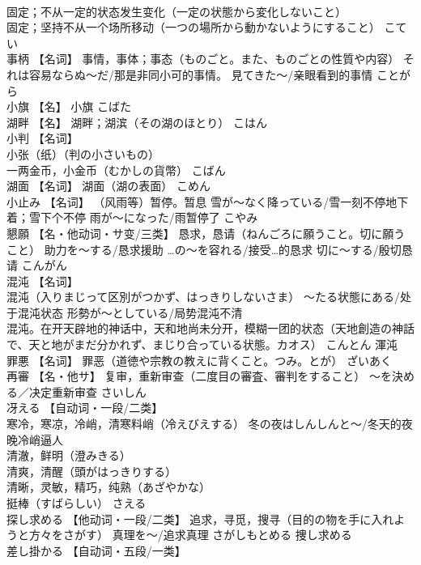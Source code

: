 \documentclass[8pt]{extreport}
\begin{document}
\begin{CJK}{UTF8}{min}
\\	固定；不从一定的状态发生变化（一定の状態から変化しないこと） 
\\	固定；坚持不从一个场所移动（一つの場所から動かないようにすること）	こてい	
\\	事柄	【名词】 事情，事体；事态（ものごと。また、ものごとの性質や内容） それは容易ならぬ～だ/那是非同小可的事情。 見てきた～/亲眼看到的事情	ことがら	
\\	小旗	【名】 小旗	こばた	
\\	湖畔	【名】 湖畔；湖滨（その湖のほとり）	こはん	
\\	小判	【名词】 
\\	小张（纸）（判の小さいもの） 
\\	一两金币，小金币（むかしの貨幣）	こばん	
\\	湖面	【名词】 湖面（湖の表面）	こめん	
\\	小止み	【名词】 （风雨等）暂停。暂息 雪が～なく降っている/雪一刻不停地下着；雪下个不停 雨が～になった/雨暂停了	こやみ	
\\	懇願	【名・他动词・サ变/三类】 恳求，恳请（ねんごろに願うこと。切に願うこと） 助力を～する/恳求援助 …の～を容れる/接受…的恳求 切に～する/殷切恳请	こんがん	
\\	混沌	【名词】 
\\	混沌（入りまじって区別がつかず、はっきりしないさま） ～たる状態にある/处于混沌状态 形勢が～としている/局势混沌不清 
\\	混沌。在开天辟地的神话中，天和地尚未分开，模糊一团的状态（天地創造の神話で、天と地がまだ分かれず、まじり合っている状態。カオス）	こんとん	渾沌
\\	罪悪	【名词】 罪恶（道徳や宗教の教えに背くこと。つみ。とが）	ざいあく	
\\	再審	【名・他サ】 复审，重新审查（二度目の審査、審判をすること） ～を決める／决定重新审查	さいしん	
\\	冴える	【自动词・一段/二类】 
\\	寒冷，寒凉，冷峭，清寒料峭（冷えびえする） 冬の夜はしんしんと～/冬天的夜晚冷峭逼人 
\\	清澈，鲜明（澄みきる） 
\\	清爽，清醒（頭がはっきりする） 
\\	清晰，灵敏，精巧，纯熟（あざやかな） 
\\	挺棒（すばらしい）	さえる	
\\	探し求める	【他动词・一段/二类】 追求，寻觅，搜寻（目的の物を手に入れようと方々をさがす） 真理を～/追求真理	さがしもとめる	捜し求める
\\	差し掛かる	【自动词・五段/一类】 

\end{CJK}
\end{document}
